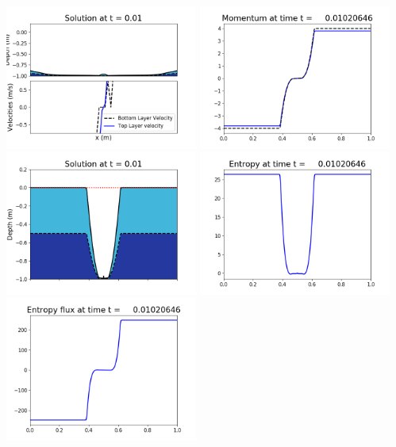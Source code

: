 \documentclass[11pt]{article}
\begin{document}
\includegraphics[width=0.475\textwidth]{frame0064fig1002.png}
\vskip 10pt 
\includegraphics[width=0.475\textwidth]{frame0064fig1003.png}
\includegraphics[width=0.475\textwidth]{frame0064fig1006.png}
\vskip 10pt 
\includegraphics[width=0.475\textwidth]{frame0064fig1007.png}
\includegraphics[width=0.475\textwidth]{frame0064fig1008.png}
\end{document}
